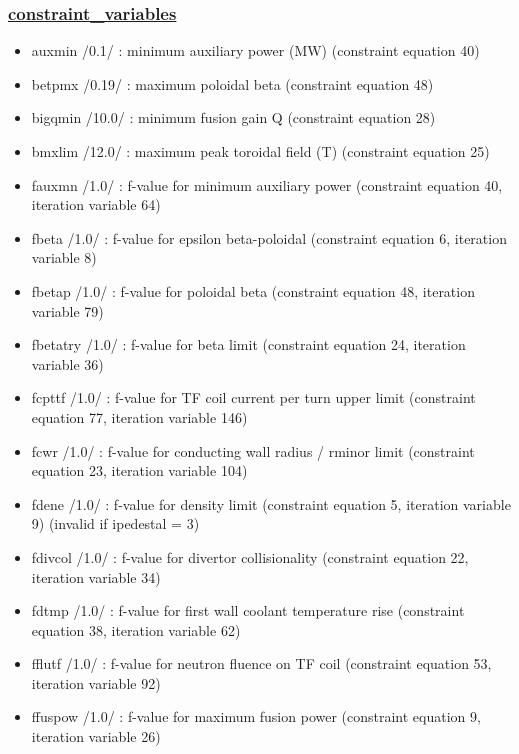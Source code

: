 \documentclass[]{article}
\providecommand{\tightlist}{%
  \setlength{\itemsep}{0pt}\setlength{\parskip}{0pt}}
\begin{document}
\begin{itemize}
  \subsubsection{\texorpdfstring{\href{constraint_variables.html}{constraint\_variables}}{constraint\_variables}}\label{constraint_variables}

  \begin{itemize}
  \tightlist
  \item
    auxmin /0.1/ : minimum auxiliary power (MW) (constraint equation 40)
  \item
    betpmx /0.19/ : maximum poloidal beta (constraint equation 48)
  \item
    bigqmin /10.0/ : minimum fusion gain Q (constraint equation 28)
  \item
    bmxlim /12.0/ : maximum peak toroidal field (T) (constraint equation
    25)
  \item
    fauxmn /1.0/ : f-value for minimum auxiliary power (constraint
    equation 40, iteration variable 64)
  \item
    fbeta /1.0/ : f-value for epsilon beta-poloidal (constraint equation
    6, iteration variable 8)
  \item
    fbetap /1.0/ : f-value for poloidal beta (constraint equation 48,
    iteration variable 79)
  \item
    fbetatry /1.0/ : f-value for beta limit (constraint equation 24,
    iteration variable 36)
  \item
    fcpttf /1.0/ : f-value for TF coil current per turn upper limit
    (constraint equation 77, iteration variable 146)
  \item
    fcwr /1.0/ : f-value for conducting wall radius / rminor limit
    (constraint equation 23, iteration variable 104)
  \item
    fdene /1.0/ : f-value for density limit (constraint equation 5,
    iteration variable 9) (invalid if ipedestal = 3)
  \item
    fdivcol /1.0/ : f-value for divertor collisionality (constraint
    equation 22, iteration variable 34)
  \item
    fdtmp /1.0/ : f-value for first wall coolant temperature rise
    (constraint equation 38, iteration variable 62)
  \item
    fflutf /1.0/ : f-value for neutron fluence on TF coil (constraint
    equation 53, iteration variable 92)
  \item
    ffuspow /1.0/ : f-value for maximum fusion power (constraint
    equation 9, iteration variable 26)

\end{itemize}
\end{itemize}
\end{document}
